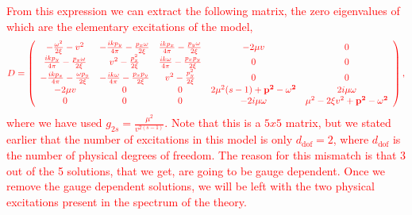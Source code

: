 \textcolor{red}{From this expression we can extract the following matrix, the zero eigenvalues of which are the elementary excitations of the model,}
\begin{align}
   \textcolor{red}{D= \left(
\begin{array}{ccccc}
    -\frac{\omega ^2}{2 \xi }-v^2 & -\frac{i k p_y}{4 \pi } - \frac{p_x \omega}{2\xi} & \frac{i k  p_x}{4 \pi } - \frac{p_y \omega}{2\xi} & -2 \mu  v & 0 \\
 \frac{i k p_y}{4 \pi } - \frac{p_x \omega}{2\xi} & v^2-\frac{p_x^2}{2 \xi } & \frac{i k \omega }{4 \pi } - \frac{p_x p_y}{2\xi}& 0 & 0 \\
 -\frac{i k p_x}{4 \pi } - \frac{\omega p_y}{2\xi} & -\frac{i k \omega }{4 \pi } - \frac{p_x p_y}{2\xi}&  v^2-\frac{p_y^2}{2 \xi } & 0 & 0 \\
    -2 \mu  v & 0 & 0 & 2 \mu ^2 (s-1)+\bf{p}^2-\omega ^2 & 2 i \mu  \omega  \\
 0 & 0 & 0 & -2 i \mu  \omega  & \mu^2 -2 \xi v^2+\bf{p}^2-\omega^2 \\
\end{array}
    \right),} \nonumber
\end{align}
\textcolor{red}{where we have used $g_{2s} =\frac{ \mu^2}{ v^{2(s-1)}}$. Note that this is a $5x5$ matrix, but we stated earlier that the number of excitations in this model is only $d_{\text{dof}}=2$, where $d_{\text{dof}}$ is the number of physical degrees of freedom. The reason for this mismatch is that 3 out of the 5 solutions, that we get, are going to be gauge dependent. Once we remove the gauge dependent solutions, we will be left with the two physical excitations present in the spectrum of the theory.}

